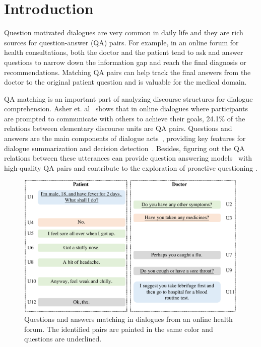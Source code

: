 \section{Introduction}
\label{sec:intro}
Question motivated dialogues are very common in daily life and 
they are rich sources for question-answer (QA) pairs. 
For example, in an online forum for health consultations, 
both the doctor and the patient tend to ask and answer questions to 
narrow down the information gap and reach the final diagnosis or 
recommendations. Matching QA pairs can help track the final answers from the doctor
to the original patient question and is valuable for the medical
domain.

QA matching is an important part of analyzing discourse structures 
for dialogue comprehension. Asher et. al~\cite{asher2016discourse} 
shows that in online dialogues where participants are prompted to 
communicate with others to achieve their goals, 24.1\% of the relations 
between elementary discourse units are QA pairs. 
Questions and answers are the main components of 
dialogue acts~\cite{stolcke2000dialogue}, providing key features for 
dialogue summarization and decision detection~\cite{fernandez2008modelling}. 
Besides, figuring out the QA relations between these utterances can 
provide question answering 
models~\cite{ji2014information,vinyals2015neural,cui2017superagent} with 
high-quality QA pairs and contribute to the exploration of proactive questioning \cite{yan2017building}.

\begin{figure}[t]
	\centering
	\includegraphics[scale=0.29]{pic_example.pdf}
	\caption{Questions and answers matching in dialogues from an online health forum. The identified pairs are painted in the same color and questions are underlined.}
	\label{fig:sample}
\end{figure}

